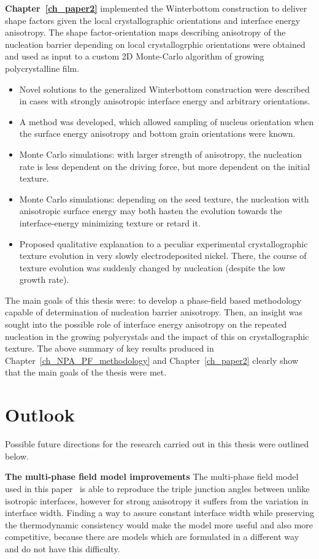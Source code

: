 \textbf{Chapter~\ref{ch_paper2}} implemented the Winterbottom construction to deliver shape factors given the local crystallographic orientations and interface energy anisotropy. The shape factor-orientation maps describing anisotropy of the nucleation barrier depending on local crystallogrphic orientations were obtained and used as input to a custom 2D Monte-Carlo algorithm of growing polycrystalline film.
\begin{itemize}
	\item Novel solutions to the generalized Winterbottom construction were described in cases with strongly anisotropic interface energy and arbitrary orientations.
	\item A method was developed, which allowed sampling of nucleus orientation when the surface energy anisotropy and bottom grain orientations were known.
	\item Monte Carlo simulations: with larger strength of anisotropy, the nucleation rate is less dependent on the driving force, but more dependent on the initial texture.
	\item Monte Carlo simulations: depending on the seed texture, the nucleation with anisotropic surface energy may both hasten the evolution towards the interface-energy minimizing texture or retard it.
	\item Proposed qualitative explanation to a peculiar experimental crystallographic texture evolution in very slowly electrodeposited nickel. There, the course of texture evolution was suddenly changed by nucleation (despite the low growth rate).
	
\end{itemize}

The main goals of this thesis were: to develop a phase-field based methodology capable of determination of nucleation barrier anisotropy. Then, an insight was sought into the possible role of interface energy anisotropy on the repeated nucleation in the growing polycrystals and the impact of this on crystallographic texture. The above summary of key results produced in Chapter~\ref{ch_NPA_PF_methodology} and Chapter~\ref{ch_paper2} clearly show that the main goals of the thesis were met.
	
\section{Outlook}
Possible future directions for the research carried out in this thesis were outlined below.

\textbf{The multi-phase field model improvements} The multi-phase field model used in this paper~\cite{Moelans2008, Minar2022} is able to reproduce the triple junction angles between unlike isotropic interfaces, however for strong anisotropy it suffers from the variation in interface width. Finding a way to assure constant interface width while preserving the thermodynamic consistency would make the model more useful and also more competitive, because there are models which are formulated in a different way and do not have this difficulty.

